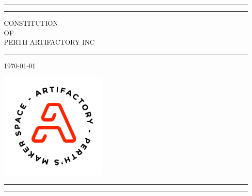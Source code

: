\documentclass[12pt]{article}
\begin{document}

\begin{titlepage}


  \centering %


  \rule{\textwidth}{1pt} %

  \vspace{2pt}\vspace{-10mm} %

  \rule{\textwidth}{0.4pt} %

  \vspace{0.1\textheight} %


  {\Huge CONSTITUTION }\\[0.5\baselineskip] %
  {\Large OF}\\[0.5\baselineskip] %
  {\Huge PERTH ARTIFACTORY INC} %

  \vspace{0.025\textheight} %

  \rule{0.4\textwidth}{0.4pt} %

  \vspace{0.05\textheight}
  \today
  \vspace{0.2\textheight}

  \includegraphics[width=0.4\textwidth]{Artifactory_logo_COMBO-ROUND_ORANGE.png}

  \vfill

  \rule{\textwidth}{0.4pt} %
  \vspace{2pt}\vspace{-10mm} %
  \rule{\textwidth}{1pt} %

\end{titlepage}
\end{document}
